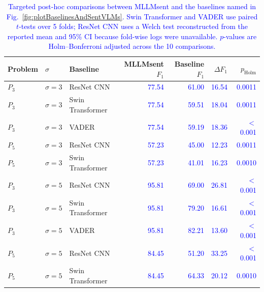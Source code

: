 \begin{table}[htbp]
\centering
\caption{\textcolor{blue}{Targeted post-hoc comparisons between MLLMsent and the baselines named in Fig.~\ref{fig:plotBaselinesAndSentVLMs}. Swin Transformer and VADER use paired $t$-tests over 5 folds; ResNet CNN uses a Welch test reconstructed from the reported mean and 95\% CI because fold-wise logs were unavailable. $p$-values are Holm--Bonferroni adjusted across the 10 comparisons.}}
\label{tab:posthoc_baselines_mllmsent}
\begin{tabular}{lllrrrr}
\hline
\textbf{Problem} & \textbf{$\sigma$} & \textbf{Baseline} & \textbf{MLLMsent $F_1$} & \textbf{Baseline $F_1$} & \textbf{$\Delta F_1$} & \textbf{$p_\text{Holm}$} \\
\hline
$P_3$ & $\sigma{=}3$ & ResNet CNN & \textcolor{blue}{77.54} & \textcolor{blue}{61.00} & \textcolor{blue}{16.54} & \textcolor{blue}{0.0011} \\
$P_3$ & $\sigma{=}3$ & Swin Transformer & \textcolor{blue}{77.54} & \textcolor{blue}{59.51} & \textcolor{blue}{18.04} & \textcolor{blue}{0.0011} \\
$P_3$ & $\sigma{=}3$ & VADER & \textcolor{blue}{77.54} & \textcolor{blue}{59.19} & \textcolor{blue}{18.36} & \textcolor{blue}{$<$0.001} \\
$P_5$ & $\sigma{=}3$ & ResNet CNN & \textcolor{blue}{57.23} & \textcolor{blue}{45.00} & \textcolor{blue}{12.23} & \textcolor{blue}{0.0011} \\
$P_5$ & $\sigma{=}3$ & Swin Transformer & \textcolor{blue}{57.23} & \textcolor{blue}{41.01} & \textcolor{blue}{16.23} & \textcolor{blue}{0.0010} \\
$P_3$ & $\sigma{=}5$ & ResNet CNN & \textcolor{blue}{95.81} & \textcolor{blue}{69.00} & \textcolor{blue}{26.81} & \textcolor{blue}{$<$0.001} \\
$P_3$ & $\sigma{=}5$ & Swin Transformer & \textcolor{blue}{95.81} & \textcolor{blue}{79.20} & \textcolor{blue}{16.61} & \textcolor{blue}{$<$0.001} \\
$P_3$ & $\sigma{=}5$ & VADER & \textcolor{blue}{95.81} & \textcolor{blue}{82.21} & \textcolor{blue}{13.60} & \textcolor{blue}{$<$0.001} \\
$P_5$ & $\sigma{=}5$ & ResNet CNN & \textcolor{blue}{84.45} & \textcolor{blue}{51.20} & \textcolor{blue}{33.25} & \textcolor{blue}{$<$0.001} \\
$P_5$ & $\sigma{=}5$ & Swin Transformer & \textcolor{blue}{84.45} & \textcolor{blue}{64.33} & \textcolor{blue}{20.12} & \textcolor{blue}{0.0010} \\
\hline
\end{tabular}
\end{table}
